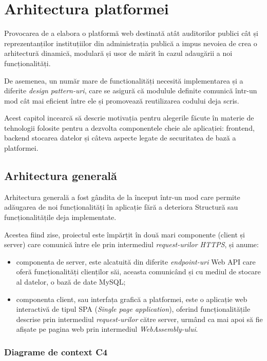 \chapter{Arhitectura platformei}
 Provocarea de a elabora o platformă web destinată atât auditorilor publici cât și reprezentanților instituțiilor din administrația publică  a impus nevoiea de crea o arhitectură dinamică, modulară și usor de mărit în cazul adaugării a noi funcționalități.
 
De asemenea, un număr mare de functionalități necesită implementarea și a diferite \textit{design pattern-uri}, care se asigură că modulule definite comunică într-un mod cât mai eficient între ele și promovează reutilizarea codului deja scris.

Acest capitol incearcă să descrie motivația pentru alegerile făcute în materie de tehnologii folosite pentru a dezvolta componentele cheie ale aplicației: frontend, backend stocarea datelor și câteva aspecte legate de securitatea de bază a platformei.

\section {Arhitectura generală}
Arhitectura generală a fost gândita de la început într-un mod care permite adăugarea de noi funcționalități în aplicație fără a deteriora Structură sau funcționalitățile deja implementate.

Acestea fiind zise, proiectul este împărțit în două mari componente (client și server)  care comunică între ele prin intermediul \textit{request-urilor HTTPS}, și anume:

\begin{itemize}
	
	\item componenta de server, este alcatuită din diferite \textit{endpoint-uri}  Web API care oferă funcționalități clienților săi, aceasta comunicând și cu mediul de stocare al datelor, o bază de date MySQL;
	
	\item componenta client, sau interfața grafică a platformei, este o aplicație web interactivă de tipul SPA (\textit{Single page application}), oferind funcționalitățile descrise prin intermediul \textit{request-urilor} către server, urmând ca mai apoi să fie afișate pe pagina web prin intermediul \textit{WebAssembly-ului}.
\end{itemize}  

\subsection*{Diagrame de context C4 }

